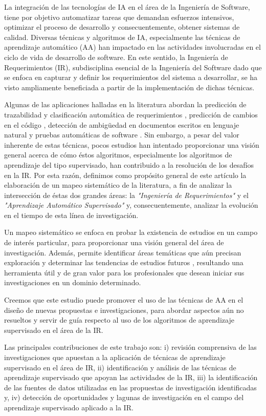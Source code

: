 \documentclass[journal]{IEEEtran}
\begin{document}
La integración de las tecnologías de IA en el área de la Ingeniería de Software, tiene por objetivo automatizar tareas que demandan esfuerzos intensivos, optimizar el proceso de desarrollo y consecuentemente, obtener sistemas de calidad. Diversas técnicas y algoritmos de IA, especialmente las técnicas de aprendizaje automático (AA) han impactado en las actividades involucradas en el ciclo de vida de desarrollo de software. En este sentido, la Ingeniería de Requerimientos (IR), subdisciplina esencial de la Ingeniería del Software dado que se enfoca en capturar y definir los requerimientos del sistema a desarrollar, se ha visto ampliamente beneficiada a partir de la implementación de dichas técnicas. 

Algunas de las aplicaciones halladas en la literatura abordan la predicción de trazabilidad y clasificación automática de requerimientos \cite{Li201725}, predicción de cambios en el código \cite{giger2012can}, detección de ambigüedad en documentos escritos en lenguaje natural \cite{yang2010extending} y pruebas automáticas de software \cite{Felbinger201623}. Sin embargo, a pesar del valor inherente de estas técnicas, pocos estudios han intentado proporcionar una visión general acerca de cómo éstos algoritmos, especialmente los algoritmos de aprendizaje del tipo supervisado, han contribuido a la resolución de los desafíos en la IR. Por esta razón, definimos como propósito general de este artículo la elaboración de un mapeo sistemático de la literatura, a fin de analizar la intersección de éstas dos grandes áreas: la \textit{"Ingeniería de Requerimientos"} y el \textit{"Aprendizaje Automático Supervisado"} y, consecuentemente, analizar la evolución en el tiempo de esta línea de investigación. 

Un mapeo sistemático se enfoca en probar la existencia de estudios en un campo de interés particular, para proporcionar una visión general del área de investigación. Además, permite identificar áreas temáticas que aún precisan exploración y determinar las tendencias de estudios futuros \cite{petersen2008systematic}, resultando una herramienta útil y de gran valor para los profesionales que desean iniciar sus investigaciones en un dominio determinado.

Creemos que este estudio puede promover el uso de las técnicas de AA en el diseño de nuevas propuestas e investigaciones, para abordar aspectos aún no resueltos y servir de guía respecto al uso de los algoritmos de aprendizaje supervisado en el área de la IR.

Las principales contribuciones de este trabajo son: i) revisión comprensiva de las investigaciones que apuestan a la aplicación de técnicas de aprendizaje supervisado en el área de IR, ii) identificación y análisis de las técnicas de aprendizaje supervisado que apoyan las actividades de la IR, iii) la identificación de las fuentes de datos utilizadas en las propuestas de investigación identificadas y, iv) detección de oportunidades y lagunas de investigación en el campo del aprendizaje supervisado aplicado a la IR.
\end{document}
